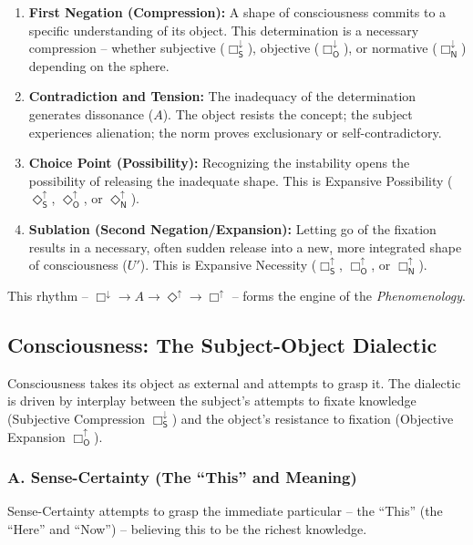 \documentclass[12pt]{book}
\newcommand{\SBoxUp}{\Box_{\mathsf{S}}^{\uparrow}}
\newcommand{\SBoxDown}{\Box_{\mathsf{S}}^{\downarrow}}
\newcommand{\SDiaUp}{\Diamond_{\mathsf{S}}^{\uparrow}}
\newcommand{\OBoxUp}{\Box_{\mathsf{O}}^{\uparrow}}
\newcommand{\OBoxDown}{\Box_{\mathsf{O}}^{\downarrow}}
\newcommand{\ODiaUp}{\Diamond_{\mathsf{O}}^{\uparrow}}
\newcommand{\NBoxUp}{\Box_{\mathsf{N}}^{\uparrow}}
\newcommand{\NBoxDown}{\Box_{\mathsf{N}}^{\downarrow}}
\newcommand{\NDiaUp}{\Diamond_{\mathsf{N}}^{\uparrow}}
\begin{document}
\begin{enumerate}
\item \textbf{First Negation (Compression):} A shape of consciousness commits to a specific understanding of its object. This determination is a necessary compression -- whether subjective ($\SBoxDown$), objective ($\OBoxDown$), or normative ($\NBoxDown$) depending on the sphere.

\item \textbf{Contradiction and Tension:} The inadequacy of the determination generates dissonance ($A$). The object resists the concept; the subject experiences alienation; the norm proves exclusionary or self-contradictory.

\item \textbf{Choice Point (Possibility):} Recognizing the instability opens the possibility of releasing the inadequate shape. This is Expansive Possibility ($\SDiaUp$, $\ODiaUp$, or $\NDiaUp$).

\item \textbf{Sublation (Second Negation/Expansion):} Letting go of the fixation results in a necessary, often sudden release into a new, more integrated shape of consciousness ($U'$). This is Expansive Necessity ($\SBoxUp$, $\OBoxUp$, or $\NBoxUp$).
\end{enumerate}

This rhythm -- $\Box^{\downarrow} \rightarrow A \rightarrow \Diamond^{\uparrow} \rightarrow \Box^{\uparrow}$ -- forms the engine of the \emph{Phenomenology}.

\subsection{Consciousness: The Subject-Object Dialectic}

Consciousness takes its object as external and attempts to grasp it. The dialectic is driven by interplay between the subject's attempts to fixate knowledge (Subjective Compression $\SBoxDown$) and the object's resistance to fixation (Objective Expansion $\OBoxUp$).

\subsubsection{A. Sense-Certainty (The ``This'' and Meaning)}

Sense-Certainty attempts to grasp the immediate particular -- the ``This'' (the ``Here'' and ``Now'') -- believing this to be the richest knowledge.
\end{document}
